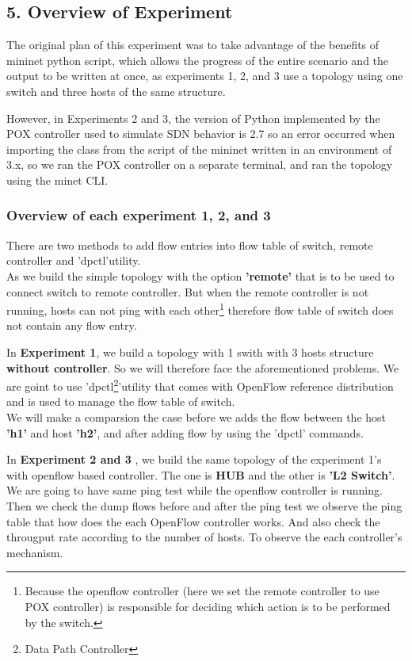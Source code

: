 \subsection*{5. Overview of Experiment}
The original plan of this experiment was to take advantage of the benefits of mininet python script, which allows the progress of the entire scenario and the output to be written at once, as experiments 1, 2, and 3 use a topology using one switch and three hosts of the same structure.

However, in Experiments 2 and 3, the version of Python implemented by the POX controller used to simulate SDN behavior is 2.7 so an error occurred when importing the class from the script of the mininet written in an environment of 3.x, so we ran the POX controller on a separate terminal, and ran the topology using the minet CLI.
\subsubsection*{Overview of each experiment 1, 2, and 3}
There are two methods to add flow entries into flow table of switch, remote controller and 'dpctl'utility.\\
As we build the simple topology with the option \textbf{'remote'} that is to be used to connect switch to remote controller. But when the remote controller is not running, hosts can not ping with each other\footnote{Because the openflow controller (here we set the remote controller to use POX controller) is responsible for deciding which action is to be performed by the switch.} therefore flow table of switch does not contain any flow entry.

In \textbf{Experiment 1}, we build a topology with 1 swith with 3 hosts structure \textbf{without controller}.
So we will therefore face the aforementioned problems. We are goint to use 'dpctl\footnote{Data Path Controller}'utility that comes with OpenFlow reference distribution and is used to manage the flow table of switch.\\
We will make a comparsion the case before we adds the flow between the host \textbf{'h1'} and host \textbf{'h2'}, and after adding flow by using the 'dpctl' commands. 

In \textbf{Experiment 2 and 3 }, we build the same topology of the experiment 1's with openflow based controller. The one is \textbf{HUB} and the other is \textbf{'L2 Switch'}.\\We are going to have same ping test while the openflow controller is running.
Then we check the dump flows before and after the ping test we observe the ping table that how does the each OpenFlow controller works. And also check the througput rate according to the number of hosts. To observe the each controller's mechanism.


\clearpage